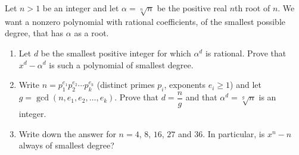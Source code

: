 Let $n>1$ be an integer and let $\alpha=\sqrt[n]{n}$ be the positive real $n$th root of $n$. We want a nonzero polynomial with rational coefficients, of the smallest possible degree, that has $\alpha$ as a root.
\begin{enumerate}
\item[(a)] Let $d$ be the smallest positive integer for which $\alpha^d$ is rational. Prove that $x^d-\alpha^d$ is such a polynomial of smallest degree.
\item[(b)] Write $n=p_1^{e_1}p_2^{e_2}\cdots p_k^{e_k}$ (distinct primes $p_i$, exponents $e_i\ge1$) and let $g=\gcd\left(n,e_1,e_2,\dots,e_k\right)$. Prove that $d=\dfrac ng$ and that $\alpha^d=\sqrt[g]{n}$ is an integer.
\item[(c)] Write down the answer for $n=4$, $8$, $16$, $27$ and $36$. In particular, is $x^n-n$ always of smallest degree?
\end{enumerate}
